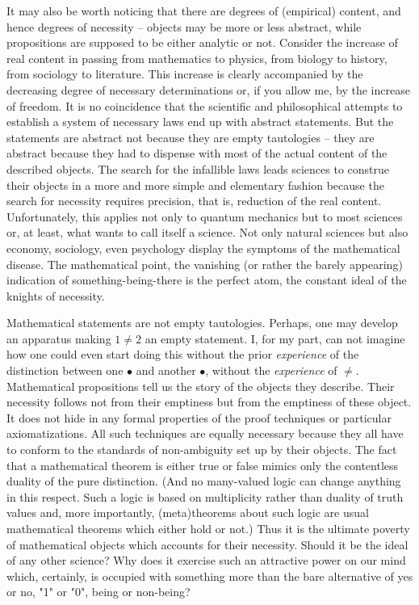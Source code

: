 It may also be worth noticing that there are degrees of (empirical) content, and hence degrees of necessity -- objects may be more or less abstract, while propositions are supposed to be either analytic or not. Consider the increase of real content in passing from mathematics to physics, from biology to history, from sociology to literature. This increase is clearly accompanied by the decreasing degree of necessary determinations or, if you allow me, by the increase of freedom. It is no coincidence that the scientific and philosophical attempts to establish a system of necessary laws end up with abstract statements. But the statements are abstract not because they are empty tautologies -- they are abstract because they had to dispense with most of the actual content of the described objects. The search for the infallible laws leads sciences to construe their objects in a more and more simple and elementary fashion because the search for necessity requires precision, that is, reduction of the real content. Unfortunately, this applies not only to quantum mechanics but to most sciences or, at least, what wants to call itself a science. Not only natural sciences but also economy, sociology, even psychology display the symptoms of the mathematical disease. The mathematical point, the vanishing (or rather the barely appearing) indication of something-being-there is the perfect atom, the constant ideal of the knights of necessity.

Mathematical statements are not empty tautologies. Perhaps, one may develop an apparatus making $1\not = 2$ an empty statement. I, for my part, can not imagine how one could even start doing this without the prior {\em experience} of the distinction between one $\bullet$ 
and another $\bullet$, without the {\em experience} of $\not =$.
 Mathematical propositions tell us the story of the objects they describe. Their necessity follows not from their emptiness but from the emptiness of these object. It does not hide in any formal properties of the proof techniques or particular axiomatizations. All such techniques are equally necessary because they all have to conform to the standards of non-ambiguity set up by their objects. The fact that a mathematical theorem is either true or false mimics only the contentless duality of the pure distinction. (And no many-valued logic can change anything in this respect. Such a logic is based on multiplicity rather than duality of truth values and, more importantly, (meta)theorems about such logic are usual mathematical theorems which either hold or not.) 
Thus it is the ultimate poverty of mathematical objects which accounts for their necessity. Should it be the ideal of any other science? Why does it exercise such an attractive power on our mind which, certainly, is occupied with something more than the bare alternative of yes or no, "1" or "0", being or non-being?


